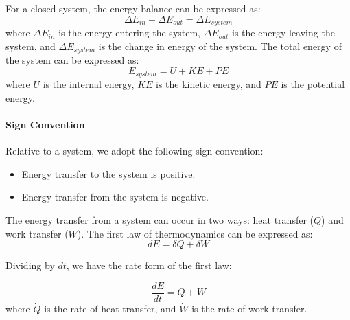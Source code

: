 \documentclass[11pt]{report}
\begin{document}
\begin{definition}
    For a closed system, the energy balance can be expressed as:
    \begin{equation}
        \Delta E_{in} - \Delta E_{out} = \Delta E_{system}
    \end{equation}
    where $\Delta E_{in}$ is the energy entering the system, $\Delta E_{out}$ is the energy leaving the system, and $\Delta E_{system}$ is the change in energy of the system. The total energy of the system can be expressed as:
    \begin{equation}
        E_{system} = U + KE + PE
    \end{equation}
    where $U$ is the internal energy, $KE$ is the kinetic energy, and $PE$ is the potential energy.
\end{definition}

\paragraph{Sign Convention} Relative to a system, we adopt the following sign convention:
\begin{itemize}
    \item Energy transfer to the system is positive.
    \item Energy transfer from the system is negative.
\end{itemize}

\begin{definition}
    The energy transfer from a system can occur in two ways: heat transfer ($Q$) and work transfer ($W$). The first law of thermodynamics can be expressed as:
    \begin{equation}
        dE = \delta Q + \delta W
    \end{equation}
\end{definition}

Dividing by $dt$, we have the rate form of the first law:
\begin{definition}
    \begin{equation}
        \frac{dE}{dt} = \dot{Q} + \dot{W}
    \end{equation}
    where $\dot{Q}$ is the rate of heat transfer, and $\dot{W}$ is the rate of work transfer.
\end{definition}
\end{document}
